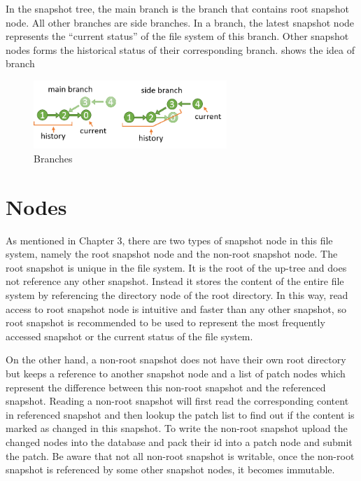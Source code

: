     In the snapshot tree, the main branch is the branch that contains root snapshot node. All other branches are side branches. In a branch, the latest snapshot node represents the “current status” of the file system of this branch. Other snapshot nodes forms the historical status of their corresponding branch.  shows the idea of branch

\begin{figure}[hbtp]
\centering
\includegraphics[width=0.65\textwidth]{Chapter-4/figs/fig22.png}
\caption{Branches}
\label{fig:branches}
\end{figure}

\section{Nodes}

    As mentioned in Chapter 3, there are two types of snapshot node in this file system, namely the root snapshot node and the non-root snapshot node.
The root snapshot is unique in the file system. It is the root of the up-tree and does not reference any other snapshot. Instead it stores the content of the entire file system by referencing the directory node of the root directory. In this way, read access to root snapshot node is intuitive and faster than any other snapshot, so root snapshot is recommended to be used to represent the most frequently accessed snapshot or the current status of the file system.

    On the other hand, a non-root snapshot does not have their own root directory but keeps a reference to another snapshot node and a list of patch nodes which represent the difference between this non-root snapshot and the referenced snapshot. Reading a non-root snapshot will first read the corresponding content in referenced snapshot and then lookup the patch list to find out if the content is marked as changed in this snapshot. To write the non-root snapshot upload the changed nodes into the database and pack their id into a patch node and submit the patch. Be aware that not all non-root snapshot is writable, once the non-root snapshot is referenced by some other snapshot nodes, it becomes immutable.

